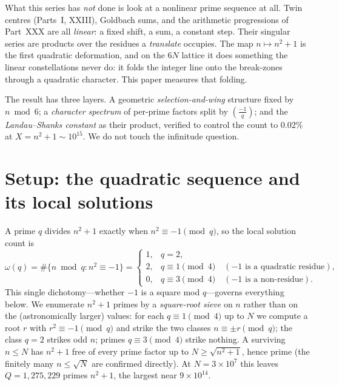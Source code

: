 \documentclass[11pt]{article}
\theoremstyle{definition}
\begin{document}
What this series has \emph{not} done is look at a nonlinear prime sequence at all. Twin centres
(Parts~I, XXIII), Goldbach sums, and the arithmetic progressions of Part~XXX \cite{PXXX} are all
\emph{linear}: a fixed shift, a sum, a constant step. Their singular series are products over the
residues a \emph{translate} occupies. The map $n\mapsto n^2+1$ is the first quadratic deformation, and
on the $6N$ lattice it does something the linear constellations never do: it folds the integer line
onto the break-zones through a quadratic character. This paper measures that folding.

The result has three layers. A geometric \emph{selection-and-wing} structure fixed by $n\bmod6$; a
\emph{character spectrum} of per-prime factors split by $\left(\frac{-1}{q}\right)$; and the
\emph{Landau--Shanks constant} as their product, verified to control the count to $0.02\%$ at
$X=n^2+1\sim10^{15}$. We do not touch the infinitude question.

\section{Setup: the quadratic sequence and its local solutions}
A prime $q$ divides $n^2+1$ exactly when $n^2\equiv-1\pmod q$, so the local solution count is
\[
\omega(q)=\#\{n\bmod q: n^2\equiv-1\}=
\begin{cases}
1,& q=2,\\
2,& q\equiv1\pmod4\quad(\text{$-1$ is a quadratic residue}),\\
0,& q\equiv3\pmod4\quad(\text{$-1$ is a non-residue}).
\end{cases}
\]
This single dichotomy---whether $-1$ is a square mod $q$---governs everything below. We enumerate
$n^2+1$ primes by a \emph{square-root sieve} on $n$ rather than on the (astronomically larger) values:
for each $q\equiv1\pmod4$ up to $N$ we compute a root $r$ with $r^2\equiv-1\pmod q$ and strike the two
classes $n\equiv\pm r\pmod q$; the class $q=2$ strikes odd $n$; primes $q\equiv3\pmod4$ strike nothing.
A surviving $n\le N$ has $n^2+1$ free of every prime factor up to $N\ge\sqrt{n^2+1}$, hence prime (the
finitely many $n\le\sqrt N$ are confirmed directly). At $N=3\times10^{7}$ this leaves
$Q=1{,}275{,}229$ primes $n^2+1$, the largest near $9\times10^{14}$.
\end{document}

